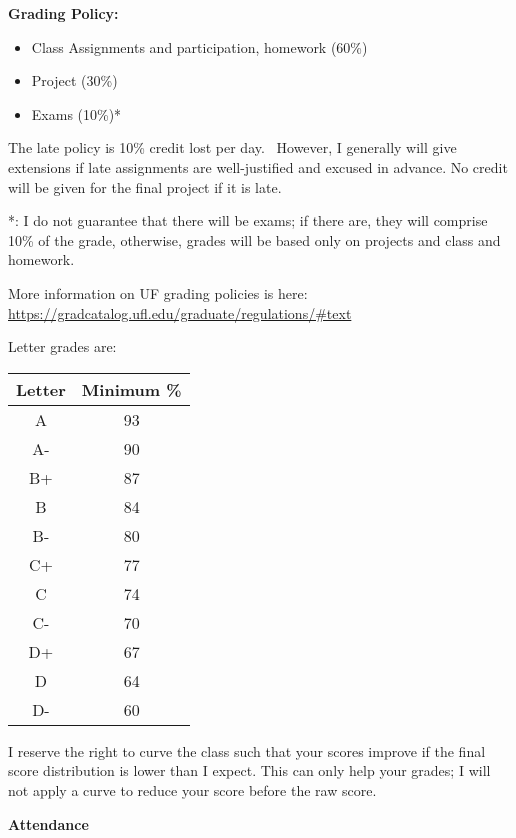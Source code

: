 \documentclass[11pt]{article}
\begin{document}
\vspace*{.15in}
\noindent\textbf{Grading Policy:}
\begin{itemize}
    \item Class Assignments and participation, homework (60\%)
    \item Project (30\%)
    \item Exams (10\%)*
\end{itemize}

The late policy is 10\% credit lost per day.  However, I generally will give extensions if late assignments are well-justified and excused in advance.
No credit will be given for the final project if it is late.

*: I do not guarantee that there will be exams; if there are, they will comprise 10\% of the grade, otherwise, grades will be based only on projects
and class and homework.

More information on UF grading policies is here:
\url{https://gradcatalog.ufl.edu/graduate/regulations/#text}


Letter grades are: \\
\begin{tabular}{|c|c|}
    \hline
    Letter & Minimum \% \\
    \hline
    A & 93 \\
    A- & 90 \\
    B+ & 87 \\
    B & 84 \\
    B- & 80 \\
    C+ & 77 \\
    C & 74 \\
    C- & 70 \\
    D+ & 67 \\
    D & 64 \\
    D- & 60 \\
    \hline
\end{tabular}

I reserve the right to curve the class such that your scores improve if the
final score distribution is lower than I expect.  This can only help your
grades; I will not apply a curve to reduce your score before the raw score.


\vspace{0.15in}
\noindent\textbf{Attendance}
\end{document}
